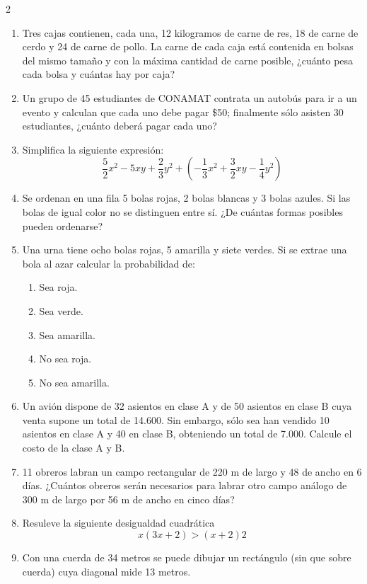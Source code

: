 \documentclass[10.5pt,letterpaper]{article}
\begin{document}
\begin{multicols}{2}
\begin{enumerate}
\begin{enumerate}
\item $p=q=r$
\end{enumerate}
\item Tres cajas contienen, cada una, 12 kilogramos de carne de res, 18 de carne de cerdo y 24 de carne de pollo. La carne de cada caja está contenida en bolsas del mismo tamaño y con la máxima cantidad de carne posible, ¿cuánto pesa cada bolsa y cuántas hay por caja?
\item Un grupo de 45 estudiantes de CONAMAT contrata un autobús para ir a un evento y calculan que cada uno debe pagar
\$50; finalmente sólo asisten 30 estudiantes, ¿cuánto deberá pagar cada uno?
\item Simplifica la siguiente expresión:
\begin{equation*}
\frac{5}{2}x^2-5xy+\frac{2}{3}y^2+\left(-\frac{1}{3}x^2+\frac{3}{2}xy-\frac{1}{4}y^2 \right)
\end{equation*}
\item Se ordenan en una fila 5 bolas rojas, 2 bolas blancas y 3 bolas azules.
Si las bolas de igual color no se distinguen entre sí.
¿De cuántas formas posibles pueden ordenarse?
\item Una urna tiene ocho bolas rojas, 5 amarilla y siete verdes. Si se extrae una
bola al azar calcular la probabilidad de:
\begin{enumerate}
\item Sea roja.
\item  Sea verde.
\item  Sea amarilla.
\item  No sea roja.
\item  No sea amarilla.
\end{enumerate}
\item Un avión dispone de 32 asientos en clase A y de 50 asientos en clase B cuya venta supone un total de 14.600. Sin embargo, sólo sea han vendido 10 asientos en clase A y 40 en clase B, obteniendo un total de 7.000. Calcule el costo de la clase A y B.
\item 11 obreros labran un campo rectangular de 220 m de largo y 48 de ancho en 6 días.
¿Cuántos obreros serán necesarios para labrar otro campo análogo de 300 m de
largo por 56 m de ancho en cinco días?
\item Resuleve la siguiente desigualdad cuadrática 
\begin{equation*}
x(3x+2)>(x+2)2
\end{equation*}
\item Con una cuerda de 34 metros se puede dibujar un rectángulo (sin que sobre cuerda) cuya diagonal mide 13 metros.

\end{enumerate}
\end{multicols}
\end{document}
